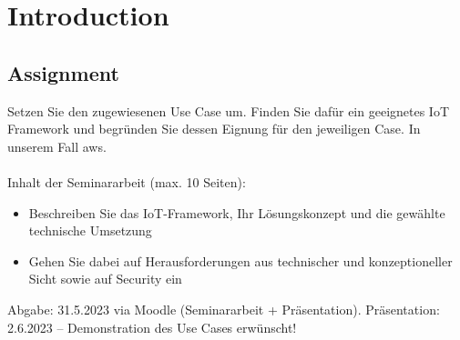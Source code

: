 \chapter{Introduction}

\section{Assignment}
Setzen Sie den zugewiesenen Use Case um.
Finden Sie dafür ein geeignetes IoT Framework und begründen Sie dessen Eignung für den jeweiligen Case. In unserem Fall \ac{aws}.\\
\\
Inhalt der Seminararbeit (max. 10 Seiten):
\begin{itemize}
    \item Beschreiben Sie das IoT-Framework, Ihr Lösungskonzept und die gewählte technische Umsetzung
    \item Gehen Sie dabei auf Herausforderungen aus technischer und konzeptioneller Sicht sowie auf Security ein
\end{itemize}
Abgabe: 31.5.2023 via Moodle (Seminararbeit + Präsentation). Präsentation: 2.6.2023 – Demonstration des Use Cases erwünscht!



